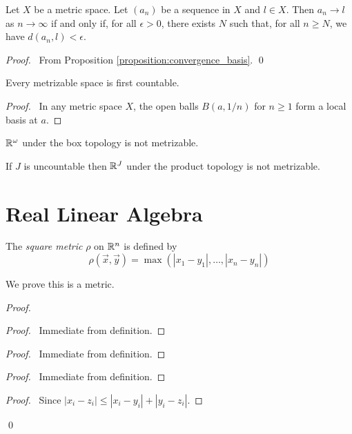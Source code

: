 \begin{proposition}
    \label{proposition:convergence_metric}
    Let $X$ be a metric space. Let $(a_n)$ be a sequence in $X$ and $l \in X$.
    Then $a_n \rightarrow l$ as $n \rightarrow \infty$ if and only if,
    for all $\epsilon > 0$, there exists $N$ such that, for all $n \geq N$,
    we have $d(a_n, l) < \epsilon$.
\end{proposition}

\begin{proof}
    \pf\ From Proposition \ref{proposition:convergence_basis}. \qed
\end{proof}

\begin{proposition}
    Every metrizable space is first countable.
\end{proposition}

\begin{proof}
    \pf\ In any metric space $X$, the open balls $B(a,1/n)$ for $n \geq 1$ form a local basis at $a$.
\end{proof}

\begin{example}
    $\mathbb{R}^\omega$ under the box topology is not metrizable.
\end{example}

\begin{example}
    If $J$ is uncountable then $\mathbb{R}^J$ under the product topology is not metrizable.
\end{example}

\section{Real Linear Algebra}

\begin{definition}
    The \emph{square metric} $\rho$ on $\mathbb{R}^n$ is defined by
    \[ \rho(\vec{x}, \vec{y}) = \max(|x_1 - y_1|, \ldots, |x_n - y_n|) \]
\end{definition}

We prove this is a metric.

\begin{proof}
    \pf
    \begin{proof}
        \pf\ Immediate from definition.
    \end{proof}
    \begin{proof}
        \pf\ Immediate from definition.
    \end{proof}
    \begin{proof}
        \pf\ Immediate from definition.
    \end{proof}
    \begin{proof}
        \pf\ Since $|x_i - z_i| \leq |x_i - y_i| + |y_i - z_i|$.
    \end{proof}
    \qed
\end{proof}

